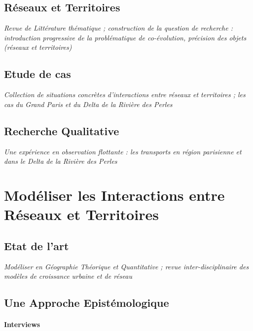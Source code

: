 \subsection{Réseaux et Territoires}

\textit{Revue de Littérature thématique ; construction de la question de recherche : introduction progressive de la problématique de co-évolution, précision des objets (réseaux et territoires)}


\subsection{Etude de cas}

\textit{Collection de situations concrètes d'interactions entre réseaux et territoires ; les cas du Grand Paris et du Delta de la Rivière des Perles} 


\subsection{Recherche Qualitative}

\textit{Une expérience en observation flottante : les transports en région parisienne et dans le Delta de la Rivière des Perles} 



\section{Modéliser les Interactions entre Réseaux et Territoires}


\subsection{Etat de l'art}

\textit{Modéliser en Géographie Théorique et Quantitative ; revue inter-disciplinaire des modèles de croissance urbaine et de réseau}


\subsection{Une Approche Epistémologique}

\paragraph{Interviews} 

